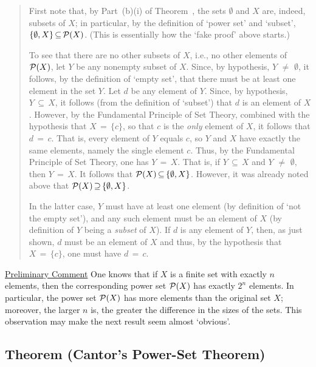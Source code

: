 {\begin{quotation}
{        First note that, by Part~(b)(i) of Theorem~, the sets ${\emptyset}$ and $X$ are, indeed, subsets of $X$;
    in particular, by the definition of `power set' and `subset', $\{{\emptyset}, X\} \,{\subseteq}\, {\cal P}(X)$.
    (This is essentially how the `fake proof' above starts.)

        To see that there are no other subsets of $X$, i.e., no other elements of ${\cal P}(X)$, let $Y$ be any nonempty subset of $X$.
    Since, by hypothesis, $Y \,\,{\neq}\,\, {\emptyset}$, it follows,
    by the definition of `empty set', that there must be at least one element in the set $Y$.
    Let $d$ be any element of $Y$. Since, by hypothesis, $Y \,{\subseteq}\, X$, it follows (from the definition of `subset') that $d$ is an element of $X$.
    However, by the Fundamental Principle of Set Theory, combined with the hypothesis that $X \,=\, \{c\}$,
    so that $c$ is the {\em only} element of $X$, it follows that $d \,=\, c$.
    That is, every element of $Y$ equals $c$, so $Y$ and $X$ have exactly the same elements,
    namely the single element $c$. Thus, by the Fundamental Principle of Set Theory, one has $Y \,=\, X$.
    That is, if $Y \,{\subseteq}\, X$ and $Y \,\,{\neq}\,\, {\emptyset}$, then $Y \,=\, X$.
    It follows that ${\cal P}(X) \,{\subseteq}\, \{{\emptyset},X\}$. However, it was already noted above that ${\cal P}(X) \,{\supseteq}\, \{{\emptyset},X\}$.

    
    In the latter case, $Y$ must have at least one element (by definition of `not the empty set'),
    and any such element must be an element of $X$ (by definition of $Y$ being a {\em subset} of $X$).
    If $d$ is any element of $Y$, then, as just shown, $d$ must be an element of $X$ and thus, by the hypothesis that $X \,=\, \{c\}$, one must have $d \,=\, c$.
}%
\end{quotation} 


\V
\V


        \underline{Preliminary Comment} One knows that if $X$ is a finite set with exactly $n$ elements,
    then the corresponding power set ${\cal P}(X)$ has exactly $2^{n}$ elements. In particular, the power set ${\cal P}(X)$ has more elements than the original set $X$;
    moreover, the larger $n$ is, the greater the difference in the sizes of the sets.
    This observation may make the next result seem almost `obvious'.

\V

            \subsection{\small{\bf Theorem} (Cantor's Power-Set Theorem)} 

}
